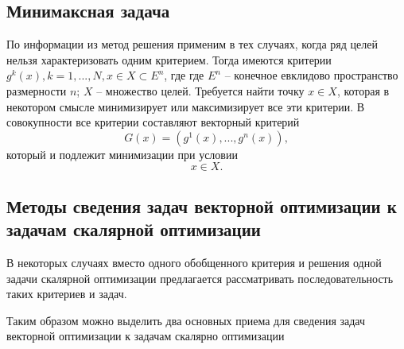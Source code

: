\subsection{Минимаксная задача}

По информации из \cite{bib4} метод решения применим в тех случаях, когда ряд целей нельзя характеризовать одним критерием. Тогда имеются критерии \begin{math}g^k(x), k = 1, ... ,N, x \in X \subset E^n\end{math}, где где \begin{math}E^n\end{math} -- конечное евклидово пространство размерности $n$; \begin{math}X\end{math} -- множество целей. Требуется найти точку \begin{math}x \in X\end{math}, которая в некотором смысле минимизирует или максимизирует все эти критерии.
В совокупности все критерии составляют векторный критерий
\begin{equation} \label{for5}
G(x) = (g^1(x), ..., g^n(x)),
\end{equation}
который и подлежит минимизации при условии
\begin{equation} \label{for6}
x \in X.
\end{equation}

\subsection{Методы сведения задач векторной оптимизации к задачам скалярной оптимизации}

В некоторых случаях вместо одного обобщенного критерия и решения одной задачи скалярной оптимизации предлагается рассматривать последовательность таких критериев и задач.

Таким образом можно выделить два основных приема для сведения задач векторной оптимизации к задачам скалярно оптимизации

